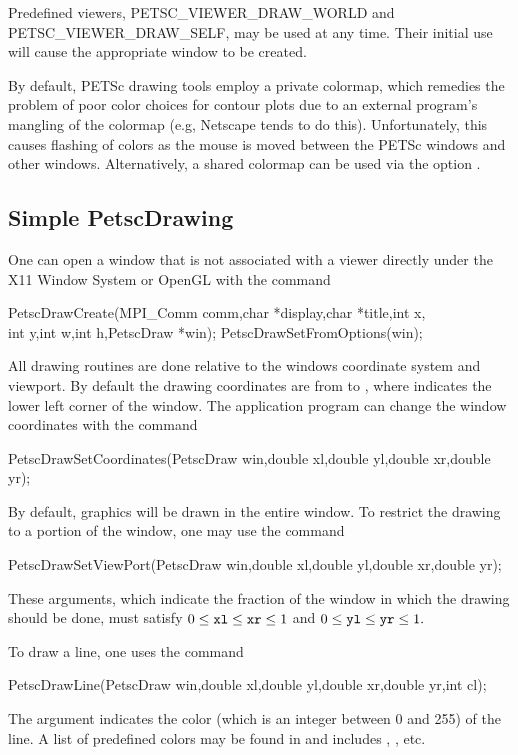 {{Predefined viewers, PETSC\_VIEWER\_DRAW\_WORLD
and PETSC\_VIEWER\_DRAW\_SELF, may be used at any time. Their initial
use will cause the appropriate window to be created.

\medskip
By default, PETSc drawing tools employ a private colormap,
which remedies the problem of poor color choices for contour plots due
to an external program's mangling of the colormap (e.g, Netscape tends
to do this).
Unfortunately, this causes flashing of colors as the mouse is moved
between the PETSc windows and other windows.  Alternatively, a shared
colormap can be used via the option .

\subsection{Simple PetscDrawing}

One can open a window that is not associated with a viewer directly
under the X11 Window System or OpenGL with the
command  
\begin{tabbing}
  PetscDrawCreate(MPI\_Comm comm,char *display,char *title,int x,\\
                 int y,int w,int h,PetscDraw *win);
  PetscDrawSetFromOptions(win);
\end{tabbing}
All drawing routines are done relative to the windows coordinate system
and viewport. By default the drawing coordinates are from  to
, where  indicates the lower left corner of the
window. The application program can change the window coordinates with the
command  
\begin{tabbing}
  PetscDrawSetCoordinates(PetscDraw win,double xl,double yl,double xr,double yr);
\end{tabbing}
By default, graphics will be drawn in the entire window. To restrict the
drawing to a portion of the window, one may
use the command
\begin{tabbing}
  PetscDrawSetViewPort(PetscDraw win,double xl,double yl,double xr,double yr);
\end{tabbing}
These arguments, which indicate the fraction of the window in which the
drawing should be done, must satisfy
$ 0 \leq {\tt xl} \leq {\tt xr} \leq 1 $ and $ 0 \leq {\tt yl} \leq {\tt yr} \leq 1.$

To draw a line, one uses
 the command 
\begin{tabbing}
  PetscDrawLine(PetscDraw win,double xl,double yl,double xr,double yr,int cl);
\end{tabbing}
The argument  indicates the color (which is an integer between 0 and 255)
of the line. A list of predefined colors may be found in 
and includes , ,  etc.

}}
